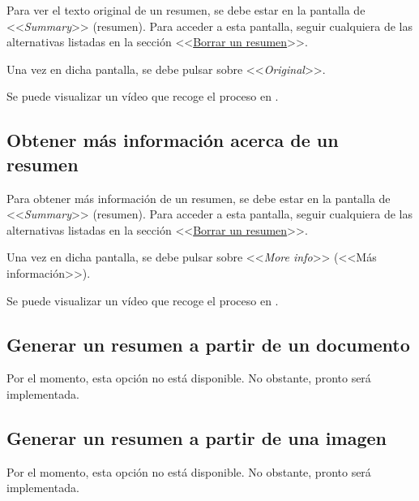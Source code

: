 Para ver el texto original de un resumen, se debe estar en la pantalla de <<\emph{Summary}>> (resumen). Para acceder a esta pantalla, seguir cualquiera de las alternativas listadas en la sección <<\hyperref[subsection:borrar]{Borrar un resumen}>>.

Una vez en dicha pantalla, se debe pulsar sobre <<\emph{Original}>>.

Se puede visualizar un vídeo que recoge el proceso en \href{}{}.

\subsection{Obtener más información acerca de un resumen}

Para obtener más información de un resumen, se debe estar en la pantalla de <<\emph{Summary}>> (resumen). Para acceder a esta pantalla, seguir cualquiera de las alternativas listadas en la sección <<\hyperref[subsection:borrar]{Borrar un resumen}>>.

Una vez en dicha pantalla, se debe pulsar sobre <<\emph{More info}>> (<<Más información>>).

Se puede visualizar un vídeo que recoge el proceso en \href{}{}.

\subsection{Generar un resumen a partir de un documento}

Por el momento, esta opción no está disponible. No obstante, pronto será implementada.

\subsection{Generar un resumen a partir de una imagen}

Por el momento, esta opción no está disponible. No obstante, pronto será implementada.